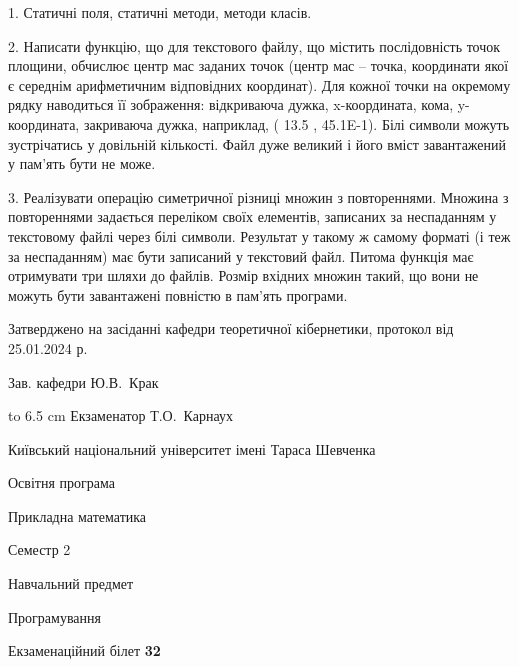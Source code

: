 \documentclass[12pt, ukrainian]{article}
\begin{document}
{%
1. Статичні поля, статичні методи, методи класів.%
\par
2. Написати функцію, що для текстового файлу, що містить послідовність точок площини, обчислює центр мас заданих точок (центр мас -- точка, координати якої є середнім арифметичним відповідних координат). Для кожної точки на окремому рядку наводиться її зображення: відкриваюча дужка, x-координата, кома, y-координата, закриваюча дужка, наприклад, ( 13.5 , 45.1E-1). Білі символи можуть зустрічатись у довільній кількості. Файл дуже великий і його вміст завантажений у пам'ять бути не може.

\par
3. Реалізувати операцію симетричної різниці множин з повтореннями. Множина з повтореннями задається переліком своїх елементів, записаних за неспаданням у текстовому файлі через білі символи. Результат у такому ж самому форматі (і теж за неспаданням) має бути записаний у текстовий файл. Питома функція має отримувати три шляхи до файлів. Розмір вхідних множин такий, що вони не можуть бути завантажені повністю в пам’ять програми.

}
{\smallskip\smallskip \begin {scriptsize} Затверджено на засіданні кафедри теоретичної кібернетики, протокол   від   25.01.2024 р.\par\smallskip\smallskip\smallskip\smallskip
{\parbox {6.5 cm} {Зав. кафедри \dotfill Ю.В.~Крак}}\hspace {0.7cm} {\hbox to 6.5 cm { Екзаменатор \dotfill Т.О.~Карнаух}} \end{scriptsize}}
\vspace{0.9cm}
{{\begin {scriptsize}\par
{ \center  Київський національний університет імені Тараса Шевченка \par}
{\parbox {5 cm}{Освітня програма \hfill}{\parbox {7 cm}{Прикладна математика\hfill}}\parbox {6 cm}{\hfill Семестр 2}}\par
{\parbox {5 cm} {Навчальний предмет \hfill}\parbox {7 cm}{Програмування \hfill}\parbox {6cm}{\hfill}\par}\vspace{-15pt} \end{scriptsize}}{\center Екзаменаційний білет \No \textbf { 32 }\par}}
\end{document}
